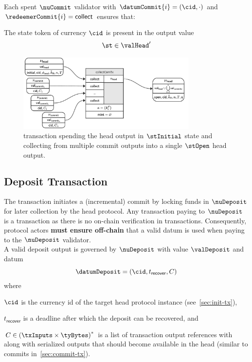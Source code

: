 \noindent Each spent $\nuCommit$ validator with $\datumCommit{i} = (\cid,\cdot)$ and $\redeemerCommit{i} = \mathsf{collect}$ ensures that:
\begin{menumerate}
  \item The state token of currency $\cid$ is present in the output value
  \[
	\st \in \valHead'
  \]
\end{menumerate}

\begin{figure}
  \centering
  \includegraphics[width=0.8\textwidth]{Hydra/Protocol/Figures/collectComTx.pdf}
  \caption{\mtxCCom{} transaction spending the head output in $\stInitial$
	state and collecting from multiple commit outputs into a single
	$\stOpen$ head output.}\label{fig:collectComTx}
\end{figure}


\subsection{Deposit Transaction}\label{sec:deposit-tx}

\noindent The \mtxDeposit{} transaction initiates a (incremental) commit by
locking funds in $\nuDeposit$ for later collection by the head protocol. Any
transaction paying to $\nuDeposit$ is a \mtxDeposit{} transaction as there is no
on-chain verification in \mtxDeposit{} transactions. Consequently, protocol
actors \textbf{must ensure off-chain} that a valid datum is used when paying to
the $\nuDeposit$ validator. \\

\noindent A valid deposit output is governed by $\nuDeposit$ with value $\valDeposit$ and datum
\[
  \datumDeposit = (\cid, t_{\mathsf{recover}}, C)
\]
where
\begin{mitemize}
  \item $\cid$ is the currency id of the target head protocol instance (see~\ref{sec:init-tx}),
  \item $t_{\mathsf{recover}}$ is a deadline after which the deposit can be recovered, and
  \item $C \in {(\txInputs \times \tyBytes)}^{*}$ is a list of transaction output
  references with along with serialized outputs that should become available in
  the head (similar to commits in~\ref{sec:commit-tx}).
\end{mitemize}

